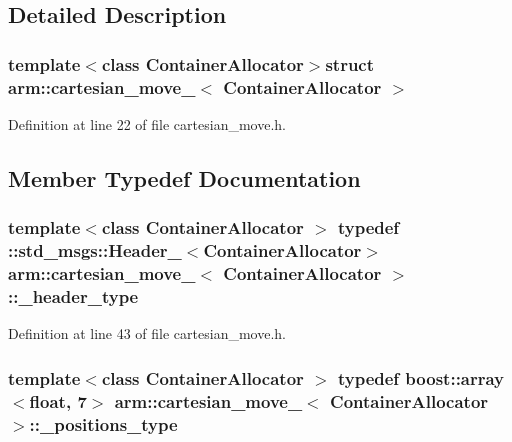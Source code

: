 \subsection{\-Detailed \-Description}
\subsubsection*{template$<$class Container\-Allocator$>$struct arm\-::cartesian\-\_\-move\-\_\-$<$ Container\-Allocator $>$}



\-Definition at line 22 of file cartesian\-\_\-move.\-h.



\subsection{\-Member \-Typedef \-Documentation}
\subsubsection[{\-\_\-header\-\_\-type}]{\setlength{\rightskip}{0pt plus 5cm}template$<$class Container\-Allocator $>$ typedef \-::std\-\_\-msgs\-::\-Header\-\_\-$<$\-Container\-Allocator$>$ {\bf arm\-::cartesian\-\_\-move\-\_\-}$<$ \-Container\-Allocator $>$\-::{\bf \-\_\-header\-\_\-type}}\label{structarm_1_1cartesian__move___aab7d3438c30a22424c6d77ea255d0d09}


\-Definition at line 43 of file cartesian\-\_\-move.\-h.

\subsubsection[{\-\_\-positions\-\_\-type}]{\setlength{\rightskip}{0pt plus 5cm}template$<$class Container\-Allocator $>$ typedef boost\-::array$<$float, 7$>$ {\bf arm\-::cartesian\-\_\-move\-\_\-}$<$ \-Container\-Allocator $>$\-::{\bf \-\_\-positions\-\_\-type}}\label{structarm_1_1cartesian__move___a9e067ecfeb47f13c19b955f22e138b1e}



